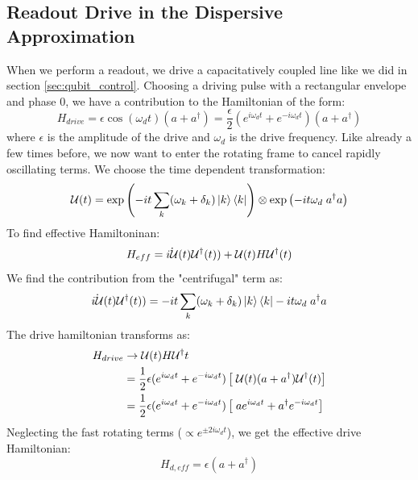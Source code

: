 \subsection{Readout Drive in the Dispersive Approximation}
When we perform a readout, we drive a capacitatively coupled line like we did in section \ref{sec:qubit_control}. Choosing a driving pulse with a rectangular envelope and phase 0, we have a contribution to the Hamiltonian of the form:
\begin{equation}
    H_{drive} = \epsilon\cos(\omega_d t)(a + a^\dagger) = \frac{\epsilon}{2} \left(e^{i\omega_d t} + e^{-i\omega_d t}\right)(a + a^\dagger)    
\end{equation}
where $\epsilon$ is the amplitude of the drive and $\omega_d$ is the drive frequency. Like already a few times before, we now want to enter the rotating frame to cancel rapidly oscillating terms. We choose the time dependent transformation:
\begin{equation}
    \mathcal{U}(t) = \exp\left(- i t \sum_k (\omega_k + \delta_k) \ket{k}\bra{k}\right) \otimes \exp \left(- i t \omega_d \;  a^\dagger a \right)
\end{equation}
To find effective Hamiltoninan:
\begin{equation}
    H_{eff} = \dot{i \mathcal{U}}{(t)}\mathcal{U}^\dagger(t)) + \mathcal{U}(t) H \mathcal{U}^\dagger(t)
\end{equation}
We find the contribution from the "centrifugal" term as:
\begin{equation}
    \dot{i \mathcal{U}}{(t)}\mathcal{U}^\dagger(t)) = - i t \sum_k (\omega_k + \delta_k) \ket{k}\bra{k} - it \omega_d \;  a^\dagger a
\end{equation}
The drive hamiltonian transforms as:
\begin{align*}
    H_{drive} &\to \mathcal{U}(t) H_{} \mathcal{U}^\dagger{t} \\
    &= \frac12 \epsilon (e^{i\omega_d t} + e^{-i\omega_d t}) \left[ \; \mathcal{U}(t)  (a + a^\dagger) \mathcal{U}^\dagger(t)\right] \\
    &= \frac12 \epsilon (e^{i\omega_d t} + e^{-i\omega_d t}) \left[ \;a e^{i \omega_d t} + a^\dagger e^{-i \omega_d t} \right]
\end{align*}
Neglecting the fast rotating terms ($\propto e^{\pm 2i\omega_dt}$), we get the effective drive Hamiltonian:
\begin{equation}
    H_{d, eff} = \epsilon(a + a^\dagger)
\end{equation}

